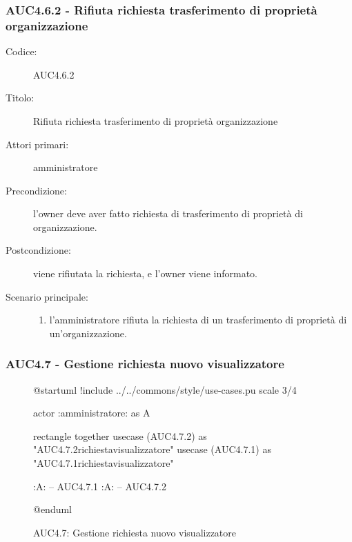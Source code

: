 \documentclass[casi-duso]{subfiles}
\begin{document}
\subsubsection{AUC4.6.2 - Rifiuta richiesta trasferimento di proprietà organizzazione}%
\label{subsub:AUC4.6.2}
\begin{description}
  \item[Codice:] AUC4.6.2
  \item[Titolo:] Rifiuta richiesta trasferimento di proprietà organizzazione
  \item[Attori primari:] amministratore
  \item[Precondizione:] l'owner deve aver fatto richiesta di trasferimento di proprietà di organizzazione.
  \item[Postcondizione:] viene rifiutata la richiesta, e l'owner viene informato.
  \item[Scenario principale:]
  \begin{enumerate}
    \item  l'amministratore rifiuta la richiesta di un trasferimento di proprietà di un'organizzazione.
  \end{enumerate}
\end{description}

\subsubsection{AUC4.7 - Gestione richiesta nuovo visualizzatore}%
\label{subsub:AUC4.7}

\begin{figure}[h!] 
  \centering 
  \begin{plantuml}
  @startuml
  !include ../../commons/style/use-cases.pu
  scale 3/4

  actor :amministratore: as A

  rectangle {
    together {
      usecase (AUC4.7.2) as "AUC4.7.2\nRifiuta richiesta\nnuovo visualizzatore"
      usecase (AUC4.7.1) as "AUC4.7.1\nAccetta richiesta\nnuovo visualizzatore"
    }
  }

  :A: -- AUC4.7.1
  :A: -- AUC4.7.2

  @enduml
  \end{plantuml} 
  \caption{AUC4.7: Gestione richiesta nuovo visualizzatore} 
  \label{fig:auc4_7} 
\end{figure}
\end{document}
